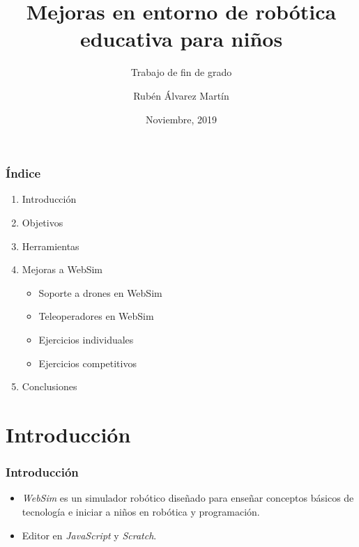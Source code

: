 \documentclass[xcolor={table}]{beamer}
\title{Mejoras en entorno de robótica  educativa para niños}
\subtitle{Trabajo de fin de grado}
\author{Rubén Álvarez Martín}
\date{Noviembre, 2019}
\begin{document}
	\setcounter{showProgressBar}{0}
	\setcounter{showSlideNumbers}{0}

	\frame{\titlepage}

	\begin{frame}
		\frametitle{Índice}
		\begin{enumerate}
			\item Introducción \\ \textcolor{ExecusharesGrey}{}
		 \textcolor{ExecusharesGrey}{\footnotesize\hspace{1em}}
 		\item Objetivos \\ \textcolor{ExecusharesGrey}{}
		 \textcolor{ExecusharesGrey}{\footnotesize\hspace{1em}}
			\item Herramientas \\ \textcolor{ExecusharesGrey}{\footnotesize\hspace{1em}}
			\item Mejoras a WebSim  \textcolor{ExecusharesGrey}{
			\begin{itemize}
			    \item Soporte a drones en WebSim
			    \item Teleoperadores en WebSim
			    \item Ejercicios individuales
			    \item Ejercicios competitivos  \\
			\end{itemize}} 
			\item Conclusiones  \textcolor{ExecusharesGrey}{\footnotesize\hspace{1em}}
		\end{enumerate}
	\end{frame}

	\setcounter{framenumber}{0}
	\setcounter{showProgressBar}{1}
	\setcounter{showSlideNumbers}{1}
	\section{Introducción}		
	\begin{frame}
			\frametitle{Introducción}
			\begin{itemize}
			    \item \textit{WebSim} es un simulador robótico diseñado para enseñar conceptos básicos de tecnología e iniciar a niños en robótica y programación.
			    \item Editor en \textit{JavaScript} y \textit{Scratch}.
			\end{itemize}
		\end{frame}
\end{document}
